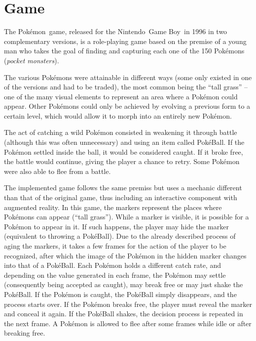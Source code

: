 \section{Game}
\label{sec:game}

The Pokémon\textregistered\ game, released for the Nintendo\textregistered\ Game Boy\textregistered\ in 1996 in two complementary versions, is a role-playing game based on the premise of a young man who takes the goal of finding and capturing each one of the 150 Pokémons (\textit{pocket monsters}).

The various Pokémons were attainable in different ways (some only existed in one of the versions and had to be traded), the most common being the ``tall grass'' -- one of the many visual elements to represent an area where a Pokémon could appear. Other Pokémons could only be achieved by evolving a previous form to a certain level, which would allow it to morph into an entirely new Pokémon.

The act of catching a wild Pokémon consisted in weakening it through battle (although this was often unnecessary) and using an item called PokéBall. If the Pokémon settled inside the ball, it would be considered caught. If it broke free, the battle would continue, giving the player a chance to retry. Some Pokémon were also able to flee from a battle.

The implemented game follows the same premiss but uses a mechanic different than that of the original game, thus including an interactive component with augmented reality. In this game, the markers represent the places where Pokémons can appear (``tall grass''). While a marker is visible, it is possible for a Pokémon to appear in it. If such happens, the player may hide the marker (equivalent to throwing a PokéBall). Due to the already described process of aging the markers, it takes a few frames for the action of the player to be recognized, after which the image of the Pokémon in the hidden marker changes into that of a PokéBall. Each Pokémon holds a different catch rate, and depending on the value generated in each frame, the Pokémon may settle (consequently being accepted as caught), may break free or may just shake the PokéBall. If the Pokémon is caught, the PokéBall simply disappears, and the process starts over. If the Pokémon breaks free, the player must reveal the marker and conceal it again. If the PokéBall shakes, the decision process is repeated in the next frame. A Pokémon is allowed to flee after some frames while idle or after breaking free.

